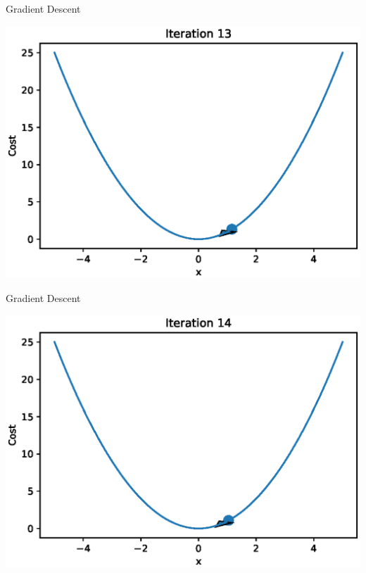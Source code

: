 \documentclass{beamer}
\begin{document}
\begin{frame}{Gradient Descent}
  \begin{center}
       \includegraphics[totalheight=6cm]{gradient-descent/iteration-13.eps}
   \end{center}
\end{frame}

\begin{frame}{Gradient Descent}
  \begin{center}
       \includegraphics[totalheight=6cm]{gradient-descent/iteration-14.eps}
   \end{center}
\end{frame}
\end{document}
